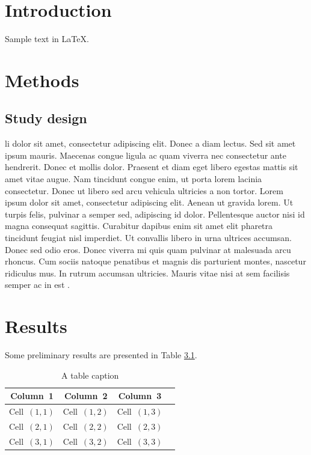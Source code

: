 \chapter{Introduction}

Sample text in \LaTeX.

\chapter{Methods}

\section{Study design}

\gls{li} dolor sit amet, consectetur adipiscing elit. Donec a diam lectus. Sed sit amet ipsum mauris. Maecenas congue ligula ac quam viverra nec consectetur ante hendrerit. Donec et mollis dolor. Praesent et diam eget libero egestas mattis sit amet vitae augue. Nam tincidunt congue enim, ut porta lorem lacinia consectetur. Donec ut libero sed arcu vehicula ultricies a non tortor. Lorem ipsum dolor sit amet, consectetur adipiscing elit. Aenean ut gravida lorem. Ut turpis felis, pulvinar a semper sed, adipiscing id dolor. Pellentesque auctor nisi id magna consequat sagittis. Curabitur dapibus enim sit amet elit pharetra tincidunt feugiat nisl imperdiet. Ut convallis libero in urna ultrices accumsan. Donec sed odio eros. Donec viverra mi quis quam pulvinar at malesuada arcu rhoncus. Cum sociis natoque penatibus et magnis dis parturient montes, nascetur ridiculus mus. In rutrum accumsan ultricies. Mauris vitae nisi at sem facilisis semper ac in est \citep{cicero1839}.

\chapter{Results}

Some preliminary results are presented in Table \ref{tab:sample_table}.

\begin{table}
	\center
	\caption{A table caption}
	\label{tab:sample_table}
	\begin{tabular}{c c c c}
		\toprule
		\bfseries{Column~1} & \bfseries{Column~2} & \bfseries{Column~3} \\
		\midrule
		Cell~$(1,1)$                   & Cell~$(1,2)$                   & Cell~$(1,3)$                   \\
		Cell~$(2,1)$                   & Cell~$(2,2)$                   & Cell~$(2,3)$                   \\
		Cell~$(3,1)$                   & Cell~$(3,2)$                   & Cell~$(3,3)$                   \\
		\bottomrule
	\end{tabular}
\end{table}

